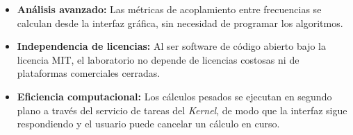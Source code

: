 \documentclass[12pt, letterpaper]{article}
\begin{document}
\begin{itemize}
    \item \textbf{Análisis avanzado:} Las métricas de acoplamiento entre frecuencias se calculan desde la interfaz gráfica, sin necesidad de programar los algoritmos.
    \item \textbf{Independencia de licencias:} Al ser software de código abierto bajo la licencia MIT, el laboratorio no depende de licencias costosas ni de plataformas comerciales cerradas.

    \item \textbf{Eficiencia computacional:} Los cálculos pesados se ejecutan en segundo plano a través del servicio de tareas del \textit{Kernel}, de modo que la interfaz sigue respondiendo y el usuario puede cancelar un cálculo en curso.
\end{itemize}
\end{document}
